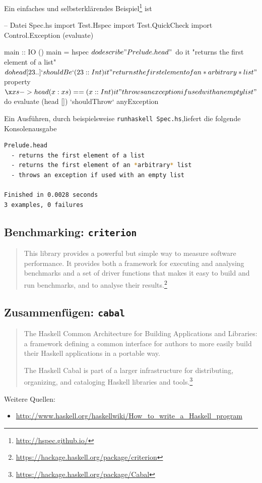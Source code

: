 Ein einfaches und selbsterklärendes
Beispiel\footnote{\url{http://hspec.github.io/}} ist
\begin{hcode}
-- Datei Spec.hs
import Test.Hspec
import Test.QuickCheck
import Control.Exception (evaluate)

main :: IO ()
main = hspec $ do
  describe "Prelude.head" $ do
    it "returns the first element of a list" $ do
      head [23 ..] `shouldBe` (23 :: Int)

    it "returns the first element of an *arbitrary* list" $
      property $ \x xs -> head (x:xs) == (x :: Int)

    it "throws an exception if used with an empty list" $ do
      evaluate (head []) `shouldThrow` anyException
\end{hcode}
Ein Ausführen, durch beispielsweise \texttt{runhaskell Spec.hs},liefert die folgende
Konsolenausgabe
\begin{lstlisting}[language=bash 
                  ,numbers=none
                  ,backgroundcolor=\color{lightgray}]
Prelude.head
  - returns the first element of a list
  - returns the first element of an *arbitrary* list
  - throws an exception if used with an empty list

Finished in 0.0028 seconds
3 examples, 0 failures
\end{lstlisting}

\subsection{Benchmarking: \texttt{criterion}}
\begin{quote}
  This library provides a powerful but simple way to measure software
  performance. It provides both a framework for executing and analysing
  benchmarks and a set of driver functions that makes it easy to build and run
  benchmarks, and to analyse their
  results.\footnote{\url{https://hackage.haskell.org/package/criterion}}
\end{quote}

\subsection{Zusammenfügen: \texttt{cabal}}
\begin{quote}
  The Haskell Common Architecture for Building Applications and Libraries: a
  framework defining a common interface for authors to more easily build their
  Haskell applications in a portable way.

  The Haskell Cabal is part of a larger infrastructure for distributing,
  organizing, and cataloging Haskell libraries and
  tools.\footnote{\url{https://hackage.haskell.org/package/Cabal}}
\end{quote}
Weitere Quellen:
\begin{itemize}
  \item \url{http://www.haskell.org/haskellwiki/How_to_write_a_Haskell_program}
\end{itemize}

